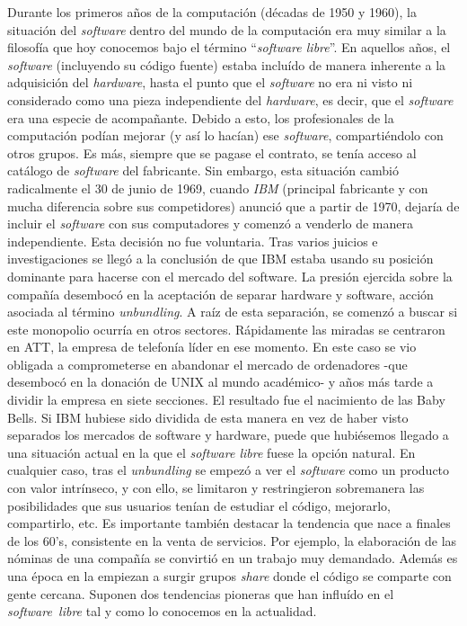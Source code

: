 Durante los primeros años de la computación (décadas de 1950 y 1960), la
situación del \textit{software} dentro del mundo de la computación era muy
similar a la filosofía que hoy conocemos bajo el término ``\textit{software
libre}''. En aquellos años, el \textit{software} (incluyendo su código fuente)
estaba incluído de manera inherente a la adquisición del \textit{hardware},
hasta el punto que el \textit{software} no era ni visto ni considerado como una
pieza independiente del \textit{hardware}, es decir, que el \textit{software}
era una especie de acompañante. Debido a esto, los profesionales de la
computación podían mejorar (y así lo hacían) ese \textit{software},
compartiéndolo con otros grupos. Es más, siempre que se pagase el contrato, se
tenía acceso al catálogo de \textit{software} del fabricante. Sin embargo, esta
situación cambió radicalmente el 30 de junio de 1969, cuando \textit{IBM}
(principal fabricante y con mucha diferencia sobre sus competidores) anunció que
a partir de 1970, dejaría de incluir el \textit{software} con sus computadores y
comenzó a venderlo de manera independiente. 
Esta decisión no fue voluntaria. Tras varios juicios e
investigaciones se llegó a la conclusión de que IBM estaba usando su
posición dominante para hacerse con el mercado del software. La
presión ejercida sobre la compañía desembocó en la aceptación de
separar hardware y software, acción asociada al término
\emph{unbundling}. A raíz de esta separación, se comenzó a buscar si
este monopolio ocurría en otros sectores. Rápidamente las miradas se
centraron en ATT, la empresa de telefonía líder en ese momento. En
este caso se vio obligada a comprometerse en abandonar el mercado de
ordenadores -que desembocó en la donación de UNIX al mundo académico-
y años más tarde a dividir la empresa en siete secciones. El resultado
fue el nacimiento de las Baby Bells. Si IBM hubiese sido dividida de
esta manera en vez de haber visto separados los mercados de software y
hardware, puede que hubiésemos llegado a una situación actual en la
que el \emph{software libre} fuese la opción natural.
En cualquier caso, tras el \emph{unbundling} se empezó a ver
el \textit{software} como un producto con valor intrínseco, y con ello, se
limitaron y restringieron sobremanera las posibilidades que sus usuarios tenían
de estudiar el código, mejorarlo, compartirlo, etc.
Es importante también destacar la tendencia que nace a finales
de los 60's, consistente en la venta de servicios. Por ejemplo, la
elaboración de las nóminas de una compañía se convirtió en un trabajo
muy demandado. Además es una época en la empiezan a surgir grupos
\emph{share} donde el código se comparte con gente cercana. Suponen
dos tendencias pioneras que han influído en el \emph{software~libre}
tal y como lo conocemos en la actualidad.

